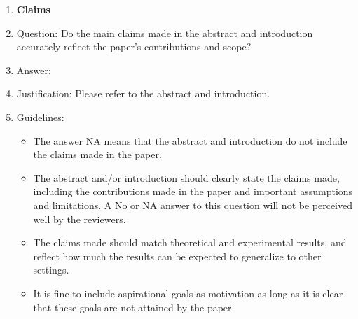 \documentclass{article}
\begin{document}
\begin{enumerate}

\item {\bf Claims}
    \item[] Question: Do the main claims made in the abstract and introduction accurately reflect the paper's contributions and scope?
    \item[] Answer: \answerYes{} %
    \item[] Justification: Please refer to the abstract and introduction.
    \item[] Guidelines:
    \begin{itemize}
        \item The answer NA means that the abstract and introduction do not include the claims made in the paper.
        \item The abstract and/or introduction should clearly state the claims made, including the contributions made in the paper and important assumptions and limitations. A No or NA answer to this question will not be perceived well by the reviewers. 
        \item The claims made should match theoretical and experimental results, and reflect how much the results can be expected to generalize to other settings. 
        \item It is fine to include aspirational goals as motivation as long as it is clear that these goals are not attained by the paper. 
    \end{itemize}


\end{enumerate}
\end{document}
